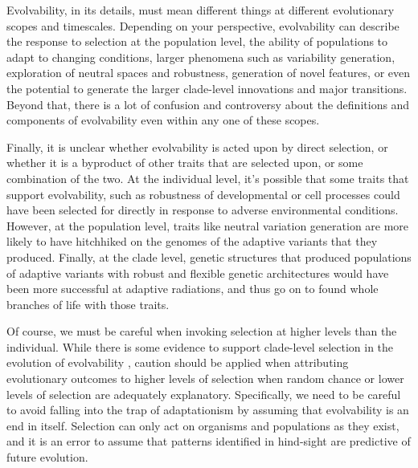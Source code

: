 \documentclass[PhD]{msu-thesis}
\begin{document}
Evolvability, in its details, must mean different things at different evolutionary scopes and timescales. 
Depending on your perspective, evolvability can describe the response to selection at the population level\cite{fisher_genetical_1930,houle_comparing_1992}, the ability of populations to adapt to changing conditions\cite{belle_code_2002}, 
larger phenomena such as variability generation\cite{gunter_p._wagner_perspective:_1996}, 
exploration of neutral spaces and robustness\cite{andreas_wagner_robustness_2005,kitano_biological_2004}, 
generation of novel features\cite{alberch_genes_1991,brookfield_evolution:_2001}, 
or even the potential to generate the larger clade-level innovations\cite{kirschner_evolvability_1998} 
and major transitions\cite{smith_major_1995}. 
Beyond that, there is a lot of confusion and controversy about the definitions and components of evolvability even within any one of these scopes\cite{pigliucci_is_2008}.

Finally, it is unclear whether evolvability is acted upon by direct selection, or whether it is a byproduct of other traits that are selected upon, or some combination of the two. At the individual level, it’s possible that some traits that support evolvability, such as robustness of developmental or cell processes\cite{kirschner_evolvability_1998} could have been selected for directly in response to adverse environmental conditions. However, at the population level, traits like neutral variation generation are more likely to have hitchhiked on the genomes of the adaptive variants that they produced. Finally, at the clade level, genetic structures that produced populations of adaptive variants with robust and flexible genetic architectures would have been more successful at adaptive radiations\cite{dawkins_13_2003}, and thus go on to found whole branches of life with those traits\cite{kirschner_evolvability_1998}. 

Of course, we must be careful when invoking selection at higher levels than the individual. While there is some evidence to support clade-level selection in the evolution of evolvability \cite{okasha_evolution_2006}, caution should be applied when attributing evolutionary outcomes to higher levels of selection when random chance or lower levels of selection are adequately explanatory. Specifically, we need to be careful to avoid falling into the trap of adaptationism\cite{gould_spandrels_1979} by assuming that evolvability is an end in itself. Selection can only act on organisms and populations as they exist, and it is an error to assume that patterns identified in hind-sight are predictive of future evolution.
\end{document}
